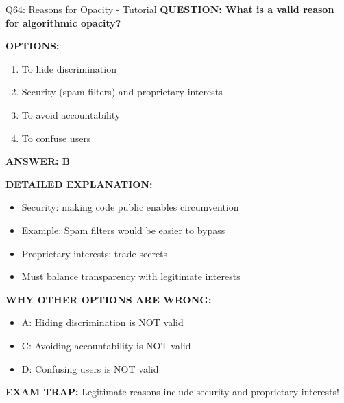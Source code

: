 \documentclass[8pt]{beamer}
\begin{document}
	\begin{frame}{Q64: Reasons for Opacity - Tutorial}
		\fontsize{6.5}{7.5}\selectfont
		\textbf{QUESTION: What is a valid reason for algorithmic opacity?}
		
		\vspace{0.1cm}
		\textbf{OPTIONS:}
		\begin{enumerate}
			\item To hide discrimination
			\item Security (spam filters) and proprietary interests
			\item To avoid accountability
			\item To confuse users
		\end{enumerate}
		
		\vspace{0.1cm}
		\textcolor{myblue}{\textbf{ANSWER: B}}
		
		\vspace{0.1cm}
		\textbf{DETAILED EXPLANATION:}
		\begin{itemize}
			\item Security: making code public enables circumvention
			\item Example: Spam filters would be easier to bypass
			\item Proprietary interests: trade secrets
			\item Must balance transparency with legitimate interests
		\end{itemize}
		
		\vspace{0.1cm}
		\textcolor{myred}{\textbf{WHY OTHER OPTIONS ARE WRONG:}}
		\begin{itemize}
			\item \textcolor{myred}{A:} Hiding discrimination is NOT valid
			\item \textcolor{myred}{C:} Avoiding accountability is NOT valid
			\item \textcolor{myred}{D:} Confusing users is NOT valid
		\end{itemize}
		
		\textcolor{myred}{\textbf{EXAM TRAP:}} Legitimate reasons include \textcolor{myblue}{security and proprietary interests}!
	\end{frame}
	
\end{document}

